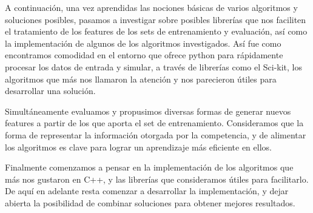 A continuación, una vez aprendidas las nociones básicas de varios algoritmos y soluciones posibles, pasamos a investigar sobre posibles librerías que nos faciliten el tratamiento de los features de los sets de entrenamiento y evaluación, así como la implementación de algunos de los algoritmos investigados. Así fue como encontramos comodidad en el entorno que ofrece python para rápidamente procesar los datos de entrada y simular, a través de librerías como el Sci-kit, los algoritmos que más nos llamaron la atención y nos parecieron útiles para desarrollar una solución.

Simultáneamente evaluamos y propusimos diversas formas de generar nuevos features a partir de los que aporta el set de entrenamiento. Consideramos que la forma de representar la información otorgada por la competencia, y de alimentar los algoritmos es clave para lograr un aprendizaje más eficiente en ellos.

Finalmente comenzamos a pensar en la implementación de los algoritmos que más nos gustaron en C++, y las librerías que consideramos útiles para facilitarlo. De aquí en adelante resta comenzar a desarrollar la implementación, y dejar abierta la posibilidad de combinar soluciones para obtener mejores resultados.